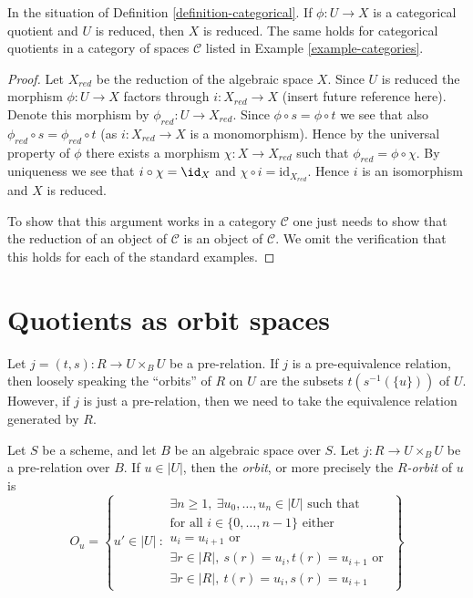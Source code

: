 \begin{lemma}
\label{lemma-categorical-reduced}
In the situation of
Definition \ref{definition-categorical}.
If $\phi : U \to X$ is a categorical quotient and $U$ is reduced,
then $X$ is reduced. The same holds for categorical quotients in
a category of spaces $\mathcal{C}$ listed in
Example \ref{example-categories}.
\end{lemma}

\begin{proof}
Let $X_{red}$ be the reduction of the algebraic space $X$.
Since $U$ is reduced the morphism $\phi : U \to X$ factors through
$i : X_{red} \to X$ (insert future reference here). Denote this morphism
by $\phi_{red} : U \to X_{red}$. Since $\phi \circ s = \phi \circ t$ we
see that also $\phi_{red} \circ s = \phi_{red} \circ t$ (as
$i : X_{red} \to X$ is a monomorphism). Hence by the universal property
of $\phi$ there exists a morphism $\chi : X \to X_{red}$ such that
$\phi_{red} = \phi \circ \chi$. By uniqueness we see that
$i \circ \chi = \id_X$ and $\chi \circ i = \text{id}_{X_{red}}$.
Hence $i$ is an isomorphism and $X$ is reduced.

\medskip\noindent
To show that this argument works in a category $\mathcal{C}$ one
just needs to show that the reduction of an object of $\mathcal{C}$
is an object of $\mathcal{C}$. We omit the verification that this
holds for each of the standard examples.
\end{proof}





\section{Quotients as orbit spaces}
\label{section-orbits}

\noindent
Let $j = (t, s) : R \to U \times_B U$ be a pre-relation.
If $j$ is a pre-equivalence relation, then loosely speaking
the ``orbits'' of $R$ on $U$
are the subsets $t(s^{-1}(\{u\}))$ of $U$. However, if $j$ is just a
pre-relation, then we need to take the equivalence relation generated
by $R$.

\begin{definition}
\label{definition-orbit}
Let $S$ be a scheme, and let $B$ be an algebraic space over $S$.
Let $j : R \to U \times_B U$ be a pre-relation over $B$.
If $u \in |U|$, then the {\it orbit}, or more precisely the
{\it $R$-orbit} of $u$ is
$$
O_u =
\left\{
u' \in |U|\ :
\begin{matrix}
\exists n \geq 1, \ \exists u_0, \ldots, u_n \in |U|\text{ such that} \\
\text{for all }i \in \{0, \ldots, n - 1\}\text{ either } \\
u_i = u_{i + 1}\text{ or } \\
\exists r \in |R|, \ s(r) = u_i, t(r) = u_{i + 1}
\text{ or } \\
\exists r \in |R|, \ t(r) = u_i, s(r) = u_{i + 1}
\end{matrix}
\right\}
$$
\end{definition}

